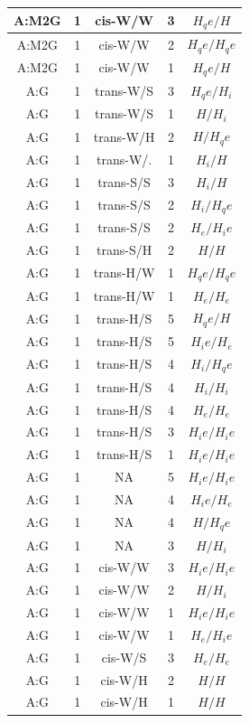 \begin{center}
\begin{longtable}{c|c|c|c|c}
A:M2G & 1 & cis-W/W & 3 & $H_qe/H$ \\  \hline
A:M2G & 1 & cis-W/W & 2 & $H_qe/H_qe$ \\  \hline
A:M2G & 1 & cis-W/W & 1 & $H_qe/H$ \\  \hline
A:G & 1 & trans-W/S & 3 & $H_qe/H_i$ \\  \hline
A:G & 1 & trans-W/S & 1 & $H/H_i$ \\  \hline
A:G & 1 & trans-W/H & 2 & $H/H_qe$ \\  \hline
A:G & 1 & trans-W/. & 1 & $H_i/H$ \\  \hline
A:G & 1 & trans-S/S & 3 & $H_i/H$ \\  \hline
A:G & 1 & trans-S/S & 2 & $H_i/H_qe$ \\  \hline
A:G & 1 & trans-S/S & 2 & $H_e/H_ie$ \\  \hline
A:G & 1 & trans-S/H & 2 & $H/H$ \\  \hline
A:G & 1 & trans-H/W & 1 & $H_qe/H_qe$ \\  \hline
A:G & 1 & trans-H/W & 1 & $H_e/H_e$ \\  \hline
A:G & 1 & trans-H/S & 5 & $H_qe/H$ \\  \hline
A:G & 1 & trans-H/S & 5 & $H_ie/H_e$ \\  \hline
A:G & 1 & trans-H/S & 4 & $H_i/H_qe$ \\  \hline
A:G & 1 & trans-H/S & 4 & $H_i/H_i$ \\  \hline
A:G & 1 & trans-H/S & 4 & $H_e/H_e$ \\  \hline
A:G & 1 & trans-H/S & 3 & $H_ie/H_ie$ \\  \hline
A:G & 1 & trans-H/S & 1 & $H_ie/H_ie$ \\  \hline
A:G & 1 & NA & 5 & $H_ie/H_ie$ \\  \hline
A:G & 1 & NA & 4 & $H_ie/H_e$ \\  \hline
A:G & 1 & NA & 4 & $H/H_qe$ \\  \hline
A:G & 1 & NA & 3 & $H/H_i$ \\  \hline
A:G & 1 & cis-W/W & 3 & $H_ie/H_ie$ \\  \hline
A:G & 1 & cis-W/W & 2 & $H/H_i$ \\  \hline
A:G & 1 & cis-W/W & 1 & $H_ie/H_ie$ \\  \hline
A:G & 1 & cis-W/W & 1 & $H_e/H_ie$ \\  \hline
A:G & 1 & cis-W/S & 3 & $H_e/H_e$ \\  \hline
A:G & 1 & cis-W/H & 2 & $H/H$ \\  \hline
A:G & 1 & cis-W/H & 1 & $H/H$ \\  \hline

\end{longtable}
\end{center}
